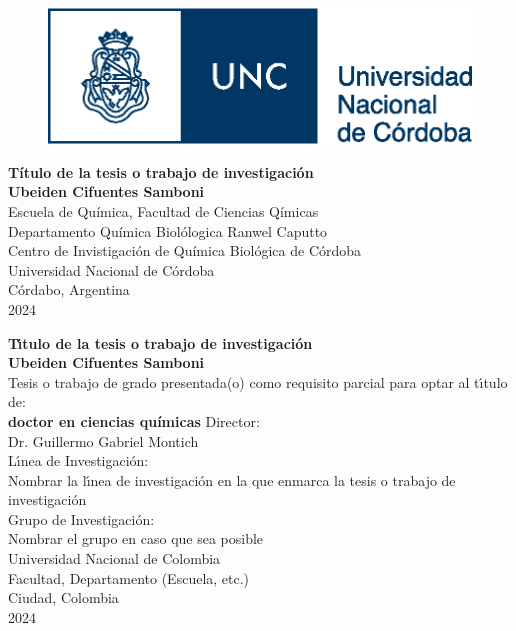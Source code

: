 \begin{center}
\begin{figure} %
    \centering
	\includegraphics[width=0.79\linewidth]{porta_cover/logo_full.eps}
\end{figure}

\thispagestyle{empty} \vspace*{2.0cm} \textbf{\huge
Título de la tesis  o trabajo de investigaci\'{o}n}\\[4.0cm]
\Large\textbf{Ubeiden Cifuentes Samboni}\\[4.0cm]
\small Escuela de Química, Facultad de Ciencias Qímicas\\ Departamento Química Biolólogica Ranwel Caputto\\
Centro de Invistigación de Química Biológica de Córdoba\\
Universidad Nacional de Córdoba\\
Córdabo, Argentina\\
2024
\end{center}

\newpage{\pagestyle{empty}\cleardoublepage}
\newpage
\begin{center}
\thispagestyle{empty} \vspace*{0cm} \textbf{\huge
T\'{\i}tulo de la tesis  o trabajo de investigaci\'{o}n}\\[3.0cm]
\Large\textbf{Ubeiden Cifuentes Samboni}\\[3.0cm]
\small Tesis o trabajo de grado presentada(o) como requisito parcial para optar al
t\'{\i}tulo de:\\
\textbf{doctor en ciencias químicas}
Director:\\
Dr. Guillermo Gabriel Montich\\[2.0cm]
L\'{\i}nea de Investigaci\'{o}n:\\
Nombrar la l\'{\i}nea de investigaci\'{o}n en la que enmarca la tesis  o trabajo de investigaci\'{o}n\\
Grupo de Investigaci\'{o}n:\\
Nombrar el grupo en caso que sea posible\\[2.5cm]
Universidad Nacional de Colombia\\
Facultad, Departamento (Escuela, etc.)\\
Ciudad, Colombia\\
2024\\
\end{center}
